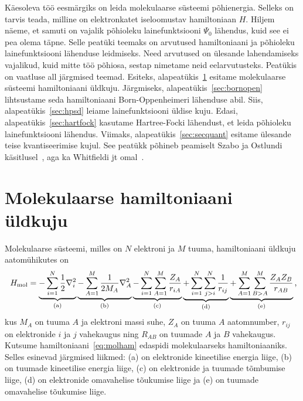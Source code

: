 \documentclass[12pt]{report}
\begin{document}
Käesoleva töö eesmärgiks on leida %
molekulaarse süsteemi põhienergia.
Selleks on tarvis teada, milline on elektronkatet iseloomustav hamiltoniaan \(H\).
Hiljem näeme, et samuti on vajalik põhioleku lainefunktsiooni $\Psi_0$ lähendus, kuid see ei pea olema täpne.
Selle peatüki teemaks on arvutused hamiltoniaani ja põhioleku lainefunktsiooni lähenduse leidmiseks.
Need arvutused on ülesande lahendamiseks vajalikud, kuid mitte töö põhiosa, sestap nimetame neid eelarvutusteks.
Peatükis on vaatluse all järgmised teemad.
Esiteks, alapeatükis~\ref{sec:molhamgen} esitame molekulaarse süsteemi hamiltoniaani üld\-kuju.
Järgmiseks, alapeatükis~\ref{sec:bornopen} lihtsustame seda hamiltoniaani Born-Oppenheimeri lähenduse abil.
Siis, alapeatükis~\ref{sec:hpsd} leiame lainefunktsiooni üldise kuju.
Edasi, alapeatükis~\ref{sec:hartfock} kasutame Hartree-Focki lähendust, et leida põhioleku lainefunktsiooni lähendus.
Viimaks, alapeatükis~\ref{sec:secquant} esitame ülesande teise kvantiseerimise kujul.
See peatükk põhineb peamiselt Szabo ja Ostlundi käsitlusel~\cite{szabo+ostlund}, aga ka Whitfieldi jt omal~\cite{whitfield+etal2011}.

\section{Molekulaarse hamiltoniaani üldkuju}\label{sec:molhamgen}

Molekulaarse süsteemi, milles on \(N\) elektroni ja \(M\) tuuma, hamiltoniaani üldkuju aatom\-ühikutes on
\begin{align}\label{eq:molham}
    H_\text{mol} =
    \underbrace{- \sum_{i = 1}^N \frac{1}{2} \nabla_i^2}_\text{(a)}
    \underbrace{- \sum_{A = 1}^M \frac{1}{2 M_A} \nabla_A^2}_\text{(b)}
    \underbrace{- \sum_{i = 1}^N \sum_{A = 1}^M \frac{Z_A}{r_{iA}}}_\text{(c)}
    \underbrace{+ \sum_{i = 1}^N \sum_{j > i}^N \frac{1}{r_{ij}}}_\text{(d)}
    \underbrace{+ \sum_{A = 1}^M \sum_{B > A}^M \frac{Z_A Z_B}{r_{AB}}}_\text{(e)} \rlap{,}
\end{align}
kus \(M_A\) on tuuma \(A\) ja elektroni massi suhe, \(Z_A\) on tuuma \(A\) aatomnumber, \(r_{ij}\) on elektronide \(i\) ja \(j\) vahekaugus ning \(R_{AB}\) on tuumade \(A\) ja \(B\) vahekaugus.
Kutsume hamiltoniaani~\eqref{eq:molham} edaspidi molekulaarseks hamiltoniaaniks.
Selles esinevad järgmised liikmed: (a) on elektronide kineetilise energia liige, (b) on tuumade kineetilise energia liige, (c) on elektronide ja tuumade tõmbumise liige, (d) on elektronide omavahelise tõukumise liige ja (e) on tuumade omavahelise tõukumise liige.
\end{document}
